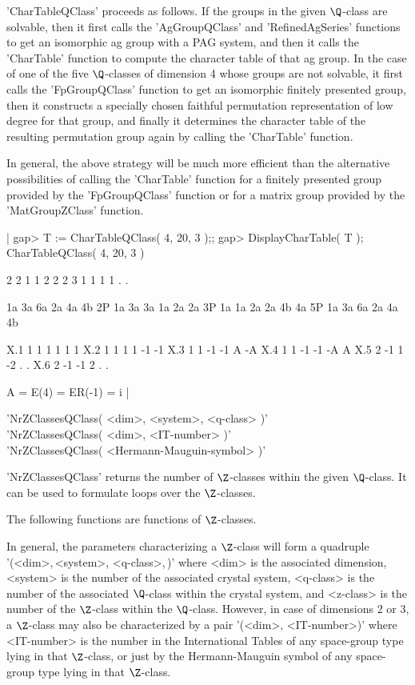'CharTableQClass'    proceeds as follows.   If the    groups in the given
$\Q$-class are  solvable,  then it first  calls the  'AgGroupQClass'  and
'RefinedAgSeries' functions to  get  an   isomorphic  ag group   with   a
PAG system,  and then it  calls  the 'CharTable'  function to compute the
character table  of that ag  group.   In the  case   of one of  the  five
$\Q$-classes of dimension 4 whose groups are not solvable, it first calls
the 'FpGroupQClass' function    to get an  isomorphic  finitely presented
group, then    it  constructs a specially   chosen   faithful permutation
representation of  low degree for  that group,  and finally it determines
the character table  of the resulting  permutation group again by calling
the 'CharTable' function.

In general,  the above  strategy will be   much  more efficient than  the
alternative  possibilities of   calling the 'CharTable'    function for a
finitely presented group provided by  the 'FpGroupQClass' function or for
a matrix group provided by the 'MatGroupZClass' function.

|    gap> T := CharTableQClass( 4, 20, 3 );;
    gap> DisplayCharTable( T );
    CharTableQClass( 4, 20, 3 )

         2  2  1  1  2  2  2
         3  1  1  1  1  .  .

           1a 3a 6a 2a 4a 4b
        2P 1a 3a 3a 1a 2a 2a
        3P 1a 1a 2a 2a 4b 4a
        5P 1a 3a 6a 2a 4a 4b

    X.1     1  1  1  1  1  1
    X.2     1  1  1  1 -1 -1
    X.3     1  1 -1 -1  A -A
    X.4     1  1 -1 -1 -A  A
    X.5     2 -1  1 -2  .  .
    X.6     2 -1 -1  2  .  .

    A = E(4)
      = ER(-1) = i |

\vspace{5mm}
'NrZClassesQClass( <dim>, <system>, <q-class> )'%
 \\
'NrZClassesQClass( <dim>, <IT-number> )' \\
'NrZClassesQClass( <Hermann-Mauguin-symbol> )'

'NrZClassesQClass' returns the number of  $\Z$-classes  within  the given
$\Q$-class. It can be used to formulate loops over the $\Z$-classes.

\vspace{5mm}
The following functions are functions of $\Z$-classes.

In  general,  the parameters  characterizing  a  $\Z$-class  will  form a
quadruple  '(<dim>,\,<system>, \mbox{<q-class>},\,<z-class>)' where <dim>
is the  associated dimension, <system>  is the  number of the  associated
crystal system,  <q-class> is  the  number of the  associated  $\Q$-class
within the crystal system, and <z-class> is the number  of the $\Z$-class
within the  $\Q$-class.  However, in   case   of dimensions   2 or 3,   a
$\Z$-class  may also be characterized  by  a pair '(<dim>,  <IT-number>)'
where <IT-number> is the number  in the International Tables \cite{Hah83}
of  any  space-group  type lying  in  that $\Z$-class,  or   just  by the
Hermann-Mauguin symbol of any space-group  type lying in that $\Z$-class.


